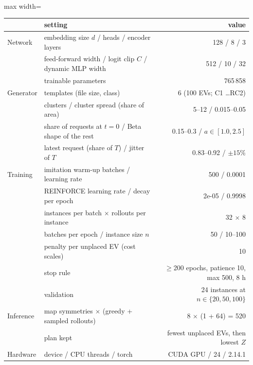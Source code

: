 \begin{adjustbox}{max width=\textwidth}\begin{tabular}{llr}\toprule
 & setting & value \\ \midrule
Network & embedding size $d$ / heads / encoder layers & 128 / 8 / 3 \\
 & feed-forward width / logit clip $C$ / dynamic MLP width & 512 / 10 / 32 \\
 & trainable parameters & 765\,858 \\
Generator & templates (file size, class) & 6 (100 EVs; C1 \dots RC2) \\
 & clusters / cluster spread (share of area) & 5--12 / 0.015--0.05 \\
 & share of requests at $t=0$ / Beta shape of the rest & 0.15--0.3 / $a\in[1.0,2.5]$ \\
 & latest request (share of $T$) / jitter of $T$ & 0.83--0.92 / $\pm15$\% \\
Training & imitation warm-up batches / learning rate & 500 / 0.0001 \\
 & REINFORCE learning rate / decay per epoch & 2e-05 / 0.9998 \\
 & instances per batch $\times$ rollouts per instance & 32 $\times$ 8 \\
 & batches per epoch / instance size $n$ & 50 / 10--100 \\
 & penalty per unplaced EV (cost scales) & 10 \\
 & stop rule & $\ge$200 epochs, patience 10, max 500, 8 h \\
 & validation & 24 instances at $n\in\{20,50,100\}$ \\
Inference & map symmetries $\times$ (greedy + sampled rollouts) & 8 $\times$ (1 + 64) = 520 \\
 & plan kept & fewest unplaced EVs, then lowest $Z$ \\
Hardware & device / CPU threads / torch & CUDA GPU / 24 / 2.14.1 \\
\bottomrule\end{tabular}\end{adjustbox}
